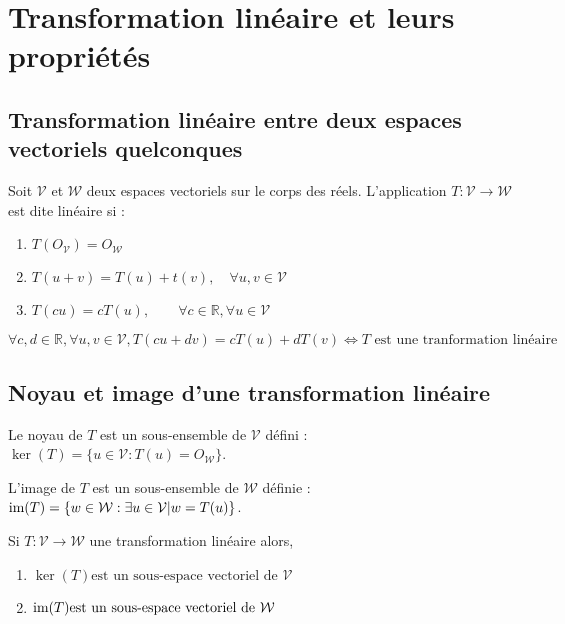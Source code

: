 \section{Transformation linéaire et leurs propriétés}
	\subsection{Transformation linéaire entre deux espaces vectoriels quelconques}
		\begin{mydef}
				Soit $\mathcal{V}$ et $\mathcal{W}$ deux espaces vectoriels sur le corps des réels. L'application $T:\mathcal{V}\longrightarrow\mathcal{W}$ est dite linéaire si :
				\begin{enumerate}
					\item $T(O_{\mathcal{V}})=O_{\mathcal{W}}$
					\item $T(u+v)=T(u)+t(v),\quad\forall u,v\in\mathcal{V}$
					\item $T(cu)=cT(u),\quad\quad\forall c\in\mathbb{R}, \forall u\in\mathcal{V}$
				\end{enumerate}
			\end{mydef}
		\begin{myprop}
				\[\forall c,d\in\mathbb{R},\forall u,v\in\mathcal{V},T(cu+dv)=cT(u)+dT(v) \Longleftrightarrow T \text{ est une tranformation linéaire} \]
		\end{myprop}
	\subsection{Noyau et image d'une transformation linéaire}
		\begin{mydef}
			\index{Noyau}
			Le noyau de $T$ est un sous-ensemble de $\mathcal{V}$ défini : $\ker (T)=\{u\in\mathcal{V} : T(u)=O_{\mathcal{W}}\}$.
		\end{mydef}
		\begin{mydef}
			\index{Image}
			L'image de $T$ est un sous-ensemble de $\mathcal{W}$ définie : $\text{\normalfont{im}}(T) = \{w\in\mathcal{W} : \exists u\in\mathcal{V} | w=T(u)\}$.
		\end{mydef}	
		\begin{myprop}
			Si $T:\mathcal{V}\longrightarrow\mathcal{W}$ une transformation linéaire alors,
			\begin{enumerate}
				\item $\ker(T) \text{est un sous-espace vectoriel de }\mathcal{V}$
				\item $\text{\normalfont{im}}(T) \text{est un sous-espace vectoriel de }\mathcal{W}$
			\end{enumerate}
		\end{myprop}

